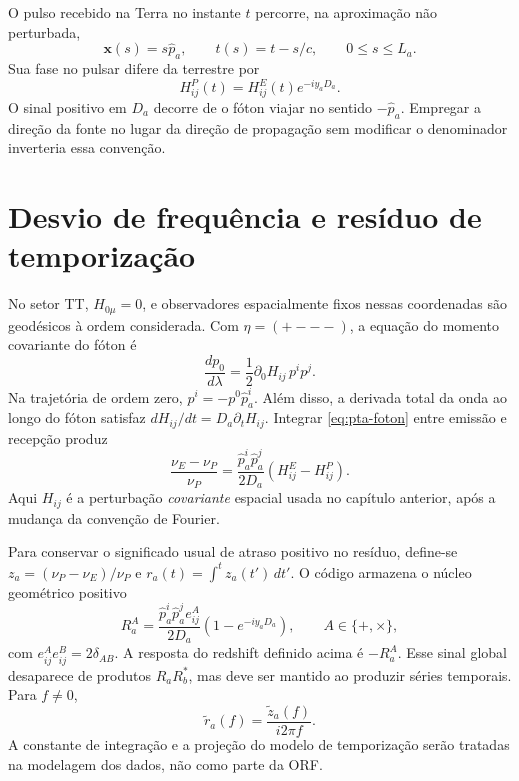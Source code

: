O pulso recebido na Terra no instante \(t\) percorre, na aproximação
não perturbada,
\begin{equation}
 \mathbf x(s)=s\hat p_a,\qquad t(s)=t-s/c,
 \qquad 0\leq s\leq L_a.
 \label{eq:pta-trajetoria}
\end{equation}
Sua fase no pulsar difere da terrestre por
\begin{equation}
 H_{ij}^{P}(t)=H_{ij}^{E}(t)e^{-iy_aD_a}.
 \label{eq:pta-fase-pulsar}
\end{equation}
O sinal positivo em \(D_a\) decorre de o fóton viajar no sentido
\(-\hat p_a\). Empregar a direção da fonte no lugar da direção de
propagação sem modificar o denominador inverteria essa convenção.

\section{Desvio de frequência e resíduo de temporização}

No setor TT, \(H_{0\mu}=0\), e observadores espacialmente fixos
nessas coordenadas são geodésicos à ordem considerada. Com
\(\eta=(+---)\), a equação do momento covariante do fóton é
\begin{equation}
 \frac{dp_0}{d\lambda}
 =\frac12\partial_0 H_{ij}\,p^ip^j.
 \label{eq:pta-foton}
\end{equation}
Na trajetória de ordem zero, \(p^i=-p^0\hat p_a^i\). Além disso,
a derivada total da onda ao longo do fóton satisfaz
\(dH_{ij}/dt=D_a\partial_tH_{ij}\). Integrar
\eqref{eq:pta-foton} entre emissão e recepção produz
\begin{equation}
 \frac{\nu_E-\nu_P}{\nu_P}
 =\frac{\hat p_a^i\hat p_a^j}{2D_a}
              (H_{ij}^{E}-H_{ij}^{P}).
 \label{eq:pta-ganho-frequencia}
\end{equation}
Aqui \(H_{ij}\) é a perturbação \emph{covariante} espacial usada
no capítulo anterior, após a mudança da convenção de Fourier.

Para conservar o significado usual de atraso positivo no resíduo,
define-se \(z_a=(\nu_P-\nu_E)/\nu_P\) e
\(r_a(t)=\int^t z_a(t')\,dt'\). O código armazena o núcleo
geométrico positivo
\begin{equation}
 R_a^A=
 \frac{\hat p_a^i\hat p_a^je_{ij}^A}{2D_a}
             (1-e^{-iy_aD_a}),
 \qquad A\in\{+,\times\},
 \label{eq:pta-nucleo}
\end{equation}
com \(e_{ij}^Ae_{ij}^B=2\delta_{AB}\). A resposta do redshift
definido acima é \(-R_a^A\). Esse sinal global desaparece de
produtos \(R_aR_b^*\), mas deve ser mantido ao produzir séries
temporais. Para \(f\ne0\),
\begin{equation}
 \widetilde r_a(f)=\frac{\widetilde z_a(f)}{i2\pi f}.
 \label{eq:pta-residuo}
\end{equation}
A constante de integração e a projeção do modelo de temporização
serão tratadas na modelagem dos dados, não como parte da ORF.

